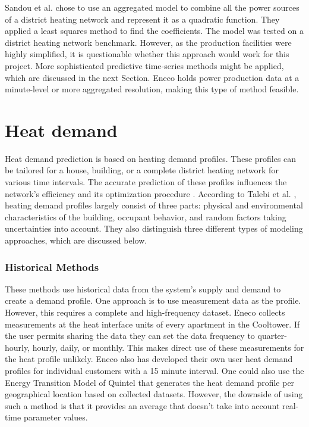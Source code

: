 Sandou et al.\cite{Sandou2005} chose to use an aggregated model to combine all the power sources of a district heating network and represent it as a quadratic function. They applied a least squares method to find the coefficients. The model was tested on a district heating network benchmark. However, as the production facilities were highly simplified, it is questionable whether this approach would work for this project. More sophisticated predictive time-series methods might be applied, which are discussed in the next Section. Eneco holds power production data at a minute-level or more aggregated resolution, making this type of method feasible. 


\section{Heat demand}
Heat demand prediction is based on heating demand profiles. These profiles can be tailored for a house, building, or a complete district heating network for various time intervals. The accurate prediction of these profiles influences the network's efficiency and its optimization procedure \cite{ORTIGA20071121}. According to Talebi et al. \cite{Talebi}, heating demand profiles largely consist of three parts: physical and environmental characteristics of the building, occupant behavior, and random factors taking uncertainties into account. They also distinguish three different types of modeling approaches, which are discussed below. 

\subsubsection{Historical Methods}
These methods use historical data from the system's supply and demand to create a demand profile. One approach is to use measurement data as the profile. However, this requires a complete and high-frequency dataset. Eneco collects measurements at the heat interface units of every apartment in the Cooltower. If the user permits sharing the data they can set the data frequency to quarter-hourly, hourly, daily, or monthly. This makes direct use of these measurements for the heat profile unlikely. Eneco also has developed their own user heat demand profiles for individual customers with a 15 minute interval. One could also use the Energy Transition Model of Quintel \cite{quintel} that generates the heat demand profile per geographical location based on collected datasets. However, the downside of using such a method is that it provides an average that doesn't take into account real-time parameter values.   

